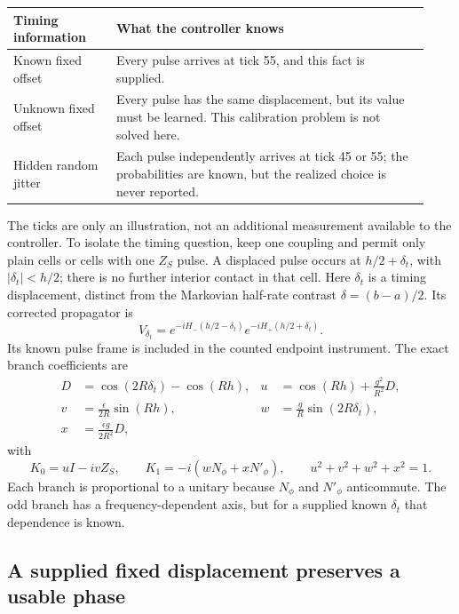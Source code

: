 \documentclass[11pt,a4paper]{article}
\numberwithin{equation}{section}
\theoremstyle{remark}
\begin{document}
\begin{center}
\begin{tabular}{@{}p{0.23\linewidth}p{0.70\linewidth}@{}}
\toprule
Timing information & What the controller knows\\
\midrule
Known fixed offset & Every pulse arrives at tick 55, and this fact is supplied.\\
Unknown fixed offset & Every pulse has the same displacement, but its value must be learned. This calibration problem is not solved here.\\
Hidden random jitter & Each pulse independently arrives at tick 45 or 55; the probabilities are known, but the realized choice is never reported.\\
\bottomrule
\end{tabular}
\end{center}
The ticks are only an illustration, not an additional measurement available
to the controller. To isolate the timing question, keep one coupling and permit
only plain cells or cells with one $Z_S$ pulse. A displaced pulse occurs at
$h/2+\delta_t$, with $|\delta_t|<h/2$; there is no further interior contact in
that cell. Here $\delta_t$ is a timing displacement, distinct from the
Markovian half-rate contrast $\delta=(b-a)/2$. Its corrected propagator is
\begin{equation}
 V_{\delta_t}=e^{-iH_-(h/2-\delta_t)}e^{-iH_+(h/2+\delta_t)}.
\end{equation}
Its known pulse frame is included in the counted endpoint instrument.
The exact branch coefficients are
\begin{align}
 D&=\cos(2R\delta_t)-\cos(Rh),&
 u&=\cos(Rh)+\frac{g^2}{R^2}D,\nonumber\\
 v&=\frac{\epsilon}{2R}\sin(Rh),&
 w&=\frac{g}{R}\sin(2R\delta_t),\nonumber\\
 x&=\frac{\epsilon g}{2R^2}D,\label{time:displacedcoeffs}
\end{align}
with
\begin{equation}
 K_0=uI-ivZ_S,\qquad K_1=-i(wN_\phi+xN'_\phi),
 \qquad u^2+v^2+w^2+x^2=1.
 \label{time:displacedbranches}
\end{equation}
Each branch is proportional to a unitary because $N_\phi$ and $N'_\phi$
anticommute. The odd branch has a frequency-dependent axis, but for a supplied
known $\delta_t$ that dependence is known.

\subsection{A supplied fixed displacement preserves a usable phase}
\end{document}
